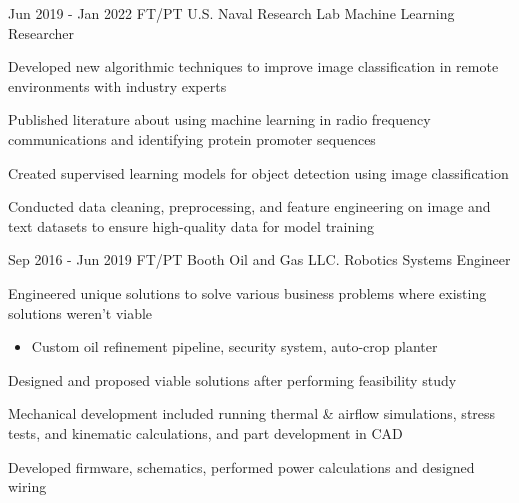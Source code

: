 \documentclass[
	12pt, %
]{FreemanCV}
\begin{document}
\jobentry
	{Jun 2019 - Jan 2022} %
	{FT/PT} %
	{U.S. Naval Research Lab} %
	{Machine Learning Researcher} %
	{ %
		\item Developed new algorithmic techniques to improve image classification in remote environments with industry experts
		\item Published literature about using machine learning in radio frequency communications and identifying protein promoter sequences
		\item Created supervised learning models for object detection using image classification
		\item Conducted data cleaning, preprocessing, and feature engineering on image and text datasets to ensure high-quality data for model training
	} 
	

	
\jobentry
{Sep 2016 - Jun 2019} %
{FT/PT} %
{Booth Oil and Gas LLC.} %
{Robotics Systems Engineer} %
{ %
	\item Engineered unique solutions to solve various business problems where existing solutions weren't viable
	\begin{itemize}[topsep=-10pt]
		\item Custom oil refinement pipeline, security system, auto-crop planter
	\end{itemize}
	\item Designed and proposed viable solutions after performing feasibility study
	\item Mechanical development included running thermal \& airflow simulations, stress tests, and kinematic calculations, and part development in CAD
	\item Developed firmware, schematics, performed power calculations and designed wiring
}


\vspace*{-10pt}
\end{document}
